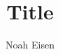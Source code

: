 \documentclass[12pt,oneside,openany]{memoir}
\begin{document}
\title{Title}
\author{Noah Eisen}
\date{}
\maketitle
\thispagestyle{empty}
\noindent
%
\end{document}
